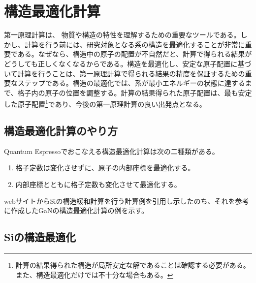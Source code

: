 \chapter{構造最適化計算}

\begin{summary}
第一原理計算は、 物質や構造の特性を理解するための重要なツールである。しかし、計算を行う前には、研究対象となる系の構造を最適化することが非常に重要である。なぜなら、構造中の原子の配置が不自然だと、計算で得られる結果がどうしても正しくなくなるからである。構造を最適化し、安定な原子配置に基づいて計算を行うことは、第一原理計算で得られる結果の精度を保証するための重要なステップである。構造の最適化では、系が最小エネルギーの状態に達するまで、格子内の原子の位置を調整する。計算の結果得られた原子配置は、最も安定した原子配置\footnote{計算の結果得られた構造が局所安定な解であることは確認する必要がある。また、構造最適化だけでは不十分な場合もある。}であり、今後の第一原理計算の良い出発点となる。
\end{summary}

\newpage

\section{構造最適化計算のやり方}
Quantum Espressoでおこなえる構造最適化計算は次の二種類がある。
\begin{enumerate}
  \item 格子定数は変化させずに、原子の内部座標を最適化する。
  \item 内部座標とともに格子定数も変化させて最適化する。
\end{enumerate}

webサイト\cite{qe-tutorial_kyoto-yukawa}からSiの構造緩和計算を行う計算例を引用し示したのち、それを参考に作成したGaNの構造最適化計算の例を示す。

\section{Siの構造最適化}
